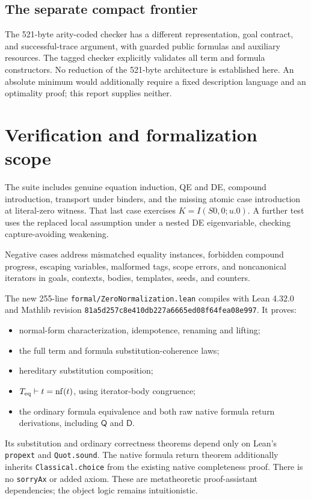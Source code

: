 \documentclass[11pt]{article}
\newcommand{\Q}{\mathsf Q}\newcommand{\D}{\mathsf D}
\newcommand{\nf}{\operatorname{nf}}\newcommand{\It}{\widehat I}
\newcommand{\code}[1]{\nolinkurl{#1}}
\begin{document}
\subsection{The separate compact frontier}
The 521-byte arity-coded checker has a different representation,
goal contract, and successful-trace argument, with guarded public
formulas and auxiliary resources. The tagged checker explicitly
validates all term and formula constructors. No reduction of the
521-byte architecture is established here. An absolute minimum
would additionally require a fixed description language and an
optimality proof; this report supplies neither.

\section{Verification and formalization scope}\label{sec:verification}


The suite includes genuine equation induction, QE and DE, compound
introduction, transport under binders, and the missing atomic case
introduction at literal-zero witness. That last case exercises
\(K=I(S0,0;u.0)\). A further test uses the replaced local assumption
under a nested DE eigenvariable, checking capture-avoiding weakening.

Negative cases address mismatched equality instances, forbidden
compound progress, escaping variables, malformed tags, scope errors,
and noncanonical iterators in goals, contexts, bodies, templates,
seeds, and counters.

The new 255-line \code{formal/ZeroNormalization.lean} compiles with
Lean 4.32.0 and Mathlib revision
\code{81a5d257c8e410db227a6665ed08f64fea08e997}. It proves:
\begin{itemize}
\item normal-form characterization, idempotence, renaming and lifting;
\item the full term and formula substitution-coherence laws;
\item hereditary substitution composition;
\item \(T_{\rm eq}\vdash t=\nf(t)\), using iterator-body congruence;
\item the ordinary formula equivalence and both raw native formula
return derivations, including \(\Q\) and \(\D\).
\end{itemize}
Its substitution and ordinary correctness theorems depend only on
Lean's \code{propext} and \code{Quot.sound}.
The native formula return theorem additionally inherits
\code{Classical.choice} from the existing native completeness proof.
There is no \code{sorryAx} or added axiom. These are metatheoretic
proof-assistant dependencies; the object logic remains intuitionistic.
\end{document}
